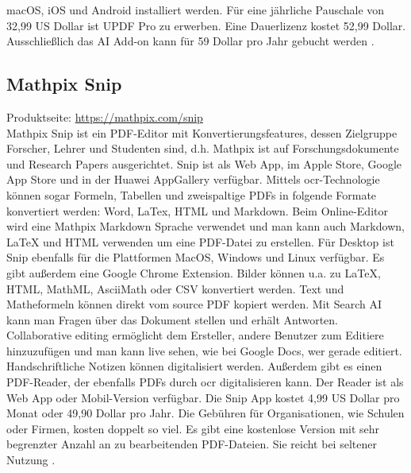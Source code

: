 macOS, iOS und Android installiert werden. Für eine jährliche Pauschale von 32,99 US Dollar ist UPDF Pro zu erwerben. Eine Dauerlizenz kostet 52,99 Dollar. Ausschließlich das AI Add-on kann für 59 Dollar pro Jahr gebucht werden \cite{updf-um}. 

\subsection{Mathpix Snip}
Produktseite: \url{https://mathpix.com/snip} \\
Mathpix Snip ist ein PDF-Editor mit Konvertierungsfeatures, dessen Zielgruppe Forscher, Lehrer und Studenten sind, d.h. Mathpix ist auf Forschungsdokumente und Research Papers ausgerichtet. Snip ist als Web App, im Apple Store, Google App Store und in der Huawei AppGallery verfügbar. Mittels \gls{ocr}-Technologie können sogar Formeln, Tabellen und zweispaltige PDFs in folgende Formate konvertiert werden: Word, LaTex, HTML und Markdown. Beim Online-Editor wird eine Mathpix Markdown Sprache verwendet und man kann auch Markdown, LaTeX und HTML verwenden um eine PDF-Datei zu erstellen. Für Desktop ist Snip ebenfalls für die Plattformen MacOS, Windows und Linux verfügbar. Es gibt außerdem eine Google Chrome Extension. Bilder können u.a. zu LaTeX, HTML, MathML, AsciiMath oder CSV konvertiert werden. Text und Matheformeln können direkt vom source PDF kopiert werden. Mit Search AI kann man Fragen über das Dokument stellen und erhält Antworten. Collaborative editing ermöglicht dem Ersteller, andere Benutzer zum Editiere hinzuzufügen und man kann live sehen, wie bei Google Docs, wer gerade editiert. Handschriftliche Notizen können digitalisiert werden. Außerdem gibt es einen PDF-Reader, der ebenfalls PDFs durch \gls{ocr} digitalisieren kann. Der Reader ist als Web App oder Mobil-Version verfügbar. Die Snip App kostet 4,99 US Dollar pro Monat oder 49,90 Dollar pro Jahr. Die Gebühren für Organisationen, wie Schulen oder Firmen, kosten doppelt so viel. Es gibt eine kostenlose Version mit sehr begrenzter Anzahl an zu bearbeitenden PDF-Dateien. Sie reicht bei seltener Nutzung \cite{snip-um}.
